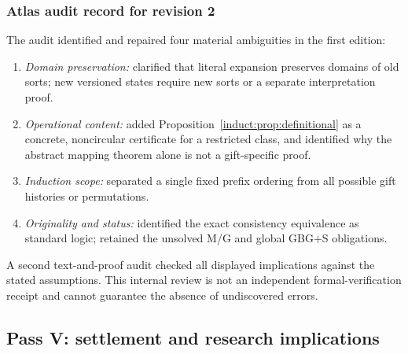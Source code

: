\documentclass[11pt,letterpaper]{article}
\theoremstyle{definition}\newtheorem{definition}[theorem]{Definition}\newtheorem{example}[theorem]{Example}
\theoremstyle{remark}\newtheorem{remark}[theorem]{Remark}
\begin{document}
\subsubsection{Atlas audit record for revision 2}

The audit identified and repaired four material ambiguities in the first edition:
\begin{enumerate}[label=(\roman*)]
\item \emph{Domain preservation:} clarified that literal expansion preserves domains of old sorts; new versioned states require new sorts or a separate interpretation proof.
\item \emph{Operational content:} added Proposition~\ref{induct:prop:definitional} as a concrete, noncircular certificate for a restricted class, and identified why the abstract mapping theorem alone is not a gift-specific proof.
\item \emph{Induction scope:} separated a single fixed prefix ordering from all possible gift histories or permutations.
\item \emph{Originality and status:} identified the exact consistency equivalence as standard logic; retained the unsolved M/G and global GBG+S obligations.
\end{enumerate}
A second text-and-proof audit checked all displayed implications against the stated assumptions. This internal review is not an independent formal-verification receipt and cannot guarantee the absence of undiscovered errors.

\subsection{Pass V: settlement and research implications}
\end{document}
